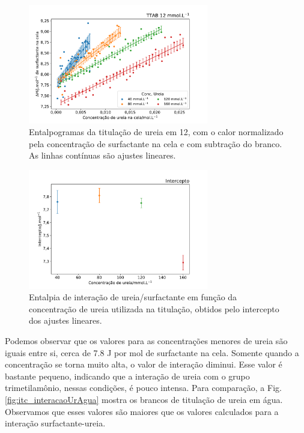 \begin{figure}[h]
	\centering
	\includegraphics[width=0.7\textwidth]{imagens/itc/interacao_ureia_surf}
	\caption{Entalpogramas da titulação de ureia em \TTAB{} 12\mM, com o calor normalizado pela concentração de surfactante na cela e com subtração do branco. As linhas contínuas são ajustes lineares.}
	\label{fig:itc_interacaoUrSurf_entalpograma}
\end{figure}


\begin{figure}[h]
	\centering
	\includegraphics[width=0.7\textwidth]{imagens/itc/interacao_intercepto}
	\caption{Entalpia de interação de ureia/surfactante em função da concentração de ureia utilizada na titulação, obtidos pelo intercepto dos ajustes lineares.}
	\label{fig:itc_interacaoUrSurf_intercepto}
\end{figure}

	Podemos observar que os valores para as concentrações menores de ureia são iguais entre si, cerca de 7.8 J por mol de surfactante na cela. Somente quando a concentração se torna muito alta, o valor de interação diminui. Esse valor é bastante pequeno, indicando que a interação de ureia com o grupo trimetilamônio, nessas condições, é pouco intensa. Para comparação, a Fig. \ref{fig:itc_interacaoUrAgua} mostra os brancos de titulação de ureia em água. Observamos que esses valores são maiores que os valores calculados para a interação surfactante-ureia.
	
